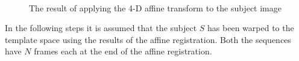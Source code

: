 \begin{figure}
     \centering
      \\
     \caption{The result of applying the 4-D affine transform to the subject image}
     \label{fig:affine4d}
\end{figure}


In the following steps it is assumed that the subject $S$ has been warped to the template space using the results of the affine registration. Both the sequences have $N$ frames each at the end of the affine registration.


